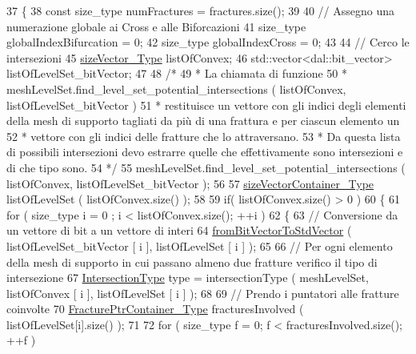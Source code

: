 \begin{DoxyCode}
37 \{
38     \textcolor{keyword}{const} size\_type numFractures = fractures.size();
39 
40     \textcolor{comment}{// Assegno una numerazione globale ai Cross e alle Biforcazioni}
41     size\_type globalIndexBifurcation = 0;
42     size\_type globalIndexCross = 0;
43 
44     \textcolor{comment}{// Cerco le intersezioni}
45     \hyperlink{Core_8h_a83c51913d041a5001e8683434c09857f}{sizeVector\_Type} listOfConvex;
46     std::vector<dal::bit\_vector> listOfLevelSet\_bitVector;
47 
48     \textcolor{comment}{/*}
49 \textcolor{comment}{     * La chiamata di funzione }
50 \textcolor{comment}{     *              meshLevelSet.find\_level\_set\_potential\_intersections ( listOfConvex,
       listOfLevelSet\_bitVector )}
51 \textcolor{comment}{     * restituisce un vettore con gli indici degli elementi della mesh di supporto tagliati da più di una
       frattura e per ciascun elemento un}
52 \textcolor{comment}{     * vettore con gli indici delle fratture che lo attraversano. }
53 \textcolor{comment}{     * Da questa lista di possibili intersezioni devo estrarre quelle che effettivamente sono intersezioni
       e di che tipo sono.}
54 \textcolor{comment}{     */}
55     meshLevelSet.find\_level\_set\_potential\_intersections ( listOfConvex, listOfLevelSet\_bitVector );
56 
57     \hyperlink{Core_8h_a80e8381d86ecb0a7f4f87ff84d1a0be5}{sizeVectorContainer\_Type} listOfLevelSet ( listOfConvex.size() );
58 
59     \textcolor{keywordflow}{if}( listOfConvex.size() > 0 )
60     \{
61         \textcolor{keywordflow}{for} ( size\_type i = 0 ; i < listOfConvex.size(); ++i )
62         \{
63             \textcolor{comment}{// Conversione da un vettore di bit a un vettore di interi}
64             \hyperlink{UsefulFunctions_8h_a0ea0b08a12a1e6a94718cf3bcd60edeb}{fromBitVectorToStdVector} ( listOfLevelSet\_bitVector [ i ], 
      listOfLevelSet [ i ] );
65 
66             \textcolor{comment}{// Per ogni elemento della mesh di supporto in cui passano almeno due fratture verifico il tipo
       di intersezione}
67             \hyperlink{classFractureIntersect_a9a4e4a784fa4c8e359767ed543f89dc5}{IntersectionType} type = intersectionType ( meshLevelSet, listOfConvex [ i ], 
      listOfLevelSet [ i ] );
68             
69             \textcolor{comment}{// Prendo i puntatori alle fratture coinvolte}
70             \hyperlink{FractureHandler_8h_a2f0b57e18ecf89912d7de0c87158009e}{FracturePtrContainer\_Type} fracturesInvolved ( listOfLevelSet[i].size()
       );
71 
72             \textcolor{keywordflow}{for} ( size\_type f = 0; f < fracturesInvolved.size(); ++f )

\end{DoxyCode}
